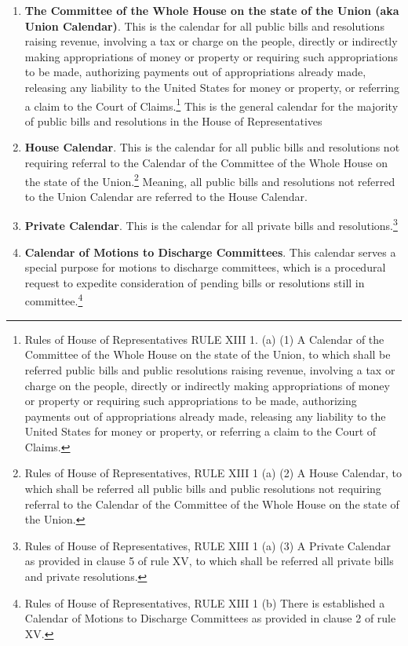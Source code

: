 \begin{enumerate}
\item \textbf{The Committee of the Whole House on the state of the Union (aka Union Calendar)}.  This is the calendar for all public bills and resolutions raising revenue, involving a tax or charge on the people, directly or indirectly making appropriations of money or property or requiring such appropriations to be made, authorizing payments out of appropriations already made, releasing any liability to the United States for money or property, or 
referring a claim to the Court of Claims.\footnote{Rules of House of Representatives RULE XIII 1. (a) (1) A Calendar of the Committee of the Whole House on the state of the Union, to which shall be referred public bills and public resolutions raising revenue, involving a tax or charge on the people, directly or indirectly making appropriations of money or property or requiring such appropriations to be made, authorizing payments out of appropriations already made, releasing any liability to the United States for money or property, or referring a claim to the Court of Claims.}
This is the general calendar for the majority of public bills and resolutions in the House of Representatives
\item \textbf{House Calendar}.  This is the calendar for all public bills and resolutions not requiring referral to the Calendar of the Committee of the Whole House on the state of the Union.\footnote{Rules of House of Representatives, RULE XIII 1 (a) (2) A House Calendar, to which shall be referred all public bills and public resolutions not requiring referral to the Calendar of the Committee of the Whole House on the state of the Union.}  Meaning, all public bills and resolutions not referred to the Union Calendar are referred to the House Calendar.

\item \textbf{Private Calendar}.  This is the calendar for all private bills and resolutions.\footnote{Rules of House of Representatives, RULE XIII 1 (a) (3) A Private Calendar as provided in clause 5 of rule XV, to which shall be referred all private bills and private resolutions.}
\item \textbf{Calendar of Motions to Discharge Committees}.  This calendar serves a special purpose for motions to discharge committees, which is a procedural request to expedite consideration of pending bills or resolutions still in committee.\footnote{Rules of House of Representatives, RULE XIII 1 (b) There is established a Calendar of Motions to Discharge Committees as provided in clause 2 of rule XV.}

\end{enumerate}


